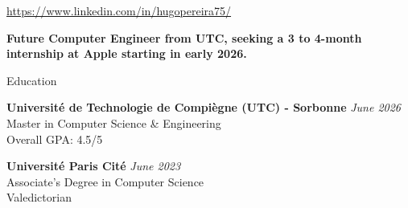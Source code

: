 \documentclass[
	10pt,
]{style} %
\begin{document}
\begin{center}
	\url{https://www.linkedin.com/in/hugopereira75/}
\end{center}

\begin{center}
	\textbf{Future Computer Engineer from UTC, seeking a 3 to 4-month internship at Apple starting in early 2026.}
\end{center}


\begin{rSection}{Education}
	
	\textbf{Université de Technologie de Compiègne (UTC) - Sorbonne} \hfill \textit{June 2026} \\
	Master in Computer Science \& Engineering \\
	Overall GPA: 4.5/5

	\textbf{Université Paris Cité} \hfill \textit{June 2023} \\
	Associate's Degree in Computer Science \\
	Valedictorian

\end{rSection}

\end{document}

